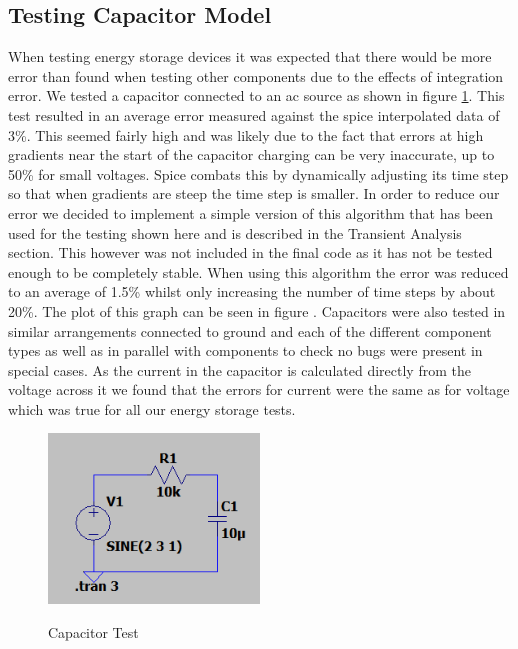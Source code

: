 \documentclass{article}
\begin{document}
\subsection{Testing Capacitor Model}
When testing energy storage devices it was expected that there would be more error than found when testing other components due to the effects of integration error. We tested a capacitor connected to an ac source as shown in figure \ref{fig:CapacitorTest1}. This test resulted in an average error measured against the spice interpolated data of 3\%. This seemed fairly high and was likely due to the fact that errors at high gradients near the start of the capacitor charging can be very inaccurate, up to 50\% for small voltages. Spice combats this by dynamically adjusting its time step so that when gradients are steep the time step is smaller. In order to reduce our error we decided to implement a simple version of this algorithm that has been used for the testing shown here and is described in the Transient Analysis section. This however was not included in the final code as it has not be tested enough to be completely stable. When using this algorithm the error was reduced to an average of 1.5\% whilst only increasing the number of time steps by about 20\%. The plot of this graph can be seen in figure . Capacitors were also tested in similar arrangements connected to ground and each of the different component types as well as in parallel with components to check no bugs were present in special cases. As the current in the capacitor is calculated directly from the voltage across it we found that the errors for current were the same as for voltage which was true for all our energy storage tests. 
\begin{figure}[h]
    \caption{Capacitor Test}
    \centering
    \includegraphics[width=0.5\textwidth]{images/CapacitorTest1.png}
    \label{fig:CapacitorTest1}
\end{figure}
\newpage
\end{document}
